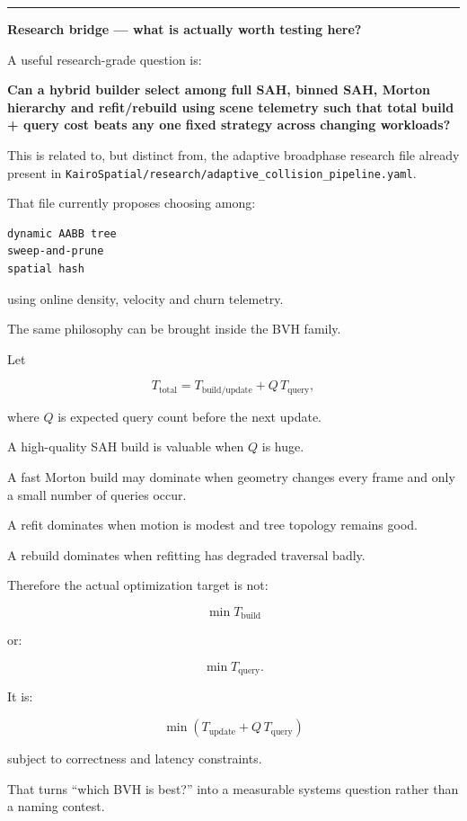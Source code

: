 \begin{center}\rule{0.5\linewidth}{0.5pt}\end{center}

\textbf{Research bridge --- what is actually worth testing here?}

A useful research-grade question is:

\textbf{Can a hybrid builder select among full SAH, binned SAH, Morton hierarchy and refit/rebuild using scene telemetry such that total build + query cost beats any one fixed strategy across changing workloads?}

This is related to, but distinct from, the adaptive broadphase research file already present in \texttt{KairoSpatial/research/adaptive\_collision\_pipeline.yaml}.

That file currently proposes choosing among:

\begin{verbatim}
dynamic AABB tree
sweep-and-prune
spatial hash
\end{verbatim}

using online density, velocity and churn telemetry.

The same philosophy can be brought inside the BVH family.

Let

\[
T_{\text{total}}
=
T_{\text{build/update}}
+
Q\,T_{\text{query}},
\]

where \(Q\) is expected query count before the next update.

A high-quality SAH build is valuable when \(Q\) is huge.

A fast Morton build may dominate when geometry changes every frame and only a small number of queries occur.

A refit dominates when motion is modest and tree topology remains good.

A rebuild dominates when refitting has degraded traversal badly.

Therefore the actual optimization target is not:

\[
\min T_{\text{build}}
\]

or:

\[
\min T_{\text{query}}.
\]

It is:

\[
\boxed{
\min
\left(
T_{\text{update}}
+
Q\,T_{\text{query}}
\right)
}
\]

subject to correctness and latency constraints.

That turns ``which BVH is best?'' into a measurable systems question rather than a naming contest.

